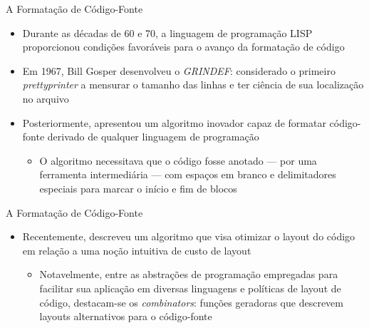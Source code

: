 \documentclass
  [ aspectratio=169,
    english,
    hyperref={citecolor=blue,colorlinks=true,linkcolor=blue,urlcolor=blue},
    brazil]
  {beamer}
\begin{document}
  \begin{frame}{A Formatação de Código-Fonte}
    \begin{itemize}
      \item Durante as décadas de 60 e 70, a linguagem de programação LISP
            proporcionou condições favoráveis para o avanço da formatação de
            código \cite[2]{yelland-2015-new}
      \item Em 1967, Bill Gosper desenvolveu o \textit{GRINDEF}: considerado o
            primeiro \textit{prettyprinter} a mensurar o tamanho das linhas e
            ter ciência de sua localização no arquivo
            \cites{gosper-2023-twubblesome}{griesemer-2022-cultural}
      \item Posteriormente, \textcite{oppen-1980-prettyprinting} apresentou um
            algoritmo inovador capaz de formatar código-fonte derivado de
            qualquer linguagem de programação
            \begin{itemize}
              \item O algoritmo necessitava que o código fosse anotado --- por
                    uma ferramenta intermediária --- com espaços em branco e
                    delimitadores especiais para marcar o início e fim de
                    blocos
            \end{itemize}
    \end{itemize}
  \end{frame}

  \begin{frame}{A Formatação de Código-Fonte}
    \begin{itemize}
      \item Recentemente, \textcite{yelland-2015-new} descreveu um algoritmo
            que visa otimizar o layout do código em relação a uma noção
            intuitiva de custo de layout
            \begin{itemize}
              \item Notavelmente, entre as abstrações de programação
                    empregadas para facilitar sua aplicação em diversas
                    linguagens e políticas de layout de código,
                    destacam-se os \textit{combinators}: funções geradoras que
                    descrevem layouts alternativos para o código-fonte
            \end{itemize}
    \end{itemize}
  \end{frame}

\end{document}
